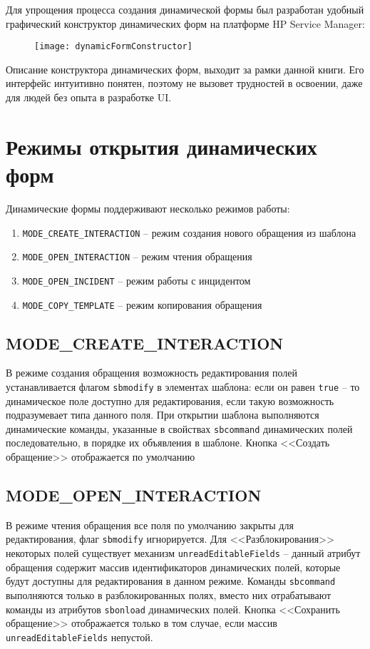 \documentclass[../index.tex]{subfiles}
\begin{document}
Для упрощения процесса создания динамической формы был разработан удобный графический конструктор
динамических форм на платформе HP Service Manager:

\begin{figure}[h]
    \texttt{[image: dynamicFormConstructor]}
    \centering
\end{figure}

Описание конструктора динамических форм, выходит за рамки данной книги.
Его интерфейс интуитивно понятен, поэтому не вызовет трудностей в освоении,
даже для людей без опыта в разработке UI.

\section{Режимы открытия динамических форм}
Динамические формы поддерживают несколько режимов работы:

\begin{enumerate}
    \item \verb|MODE_CREATE_INTERACTION| -- режим создания нового обращения из шаблона
    \item \verb|MODE_OPEN_INTERACTION| -- режим чтения обращения
    \item \verb|MODE_OPEN_INCIDENT| -- режим работы с инцидентом
    \item \verb|MODE_COPY_TEMPLATE| -- режим копирования обращения
\end{enumerate}

\subsection{MODE\_CREATE\_INTERACTION}
В режиме создания обращения возможность редактирования полей устанавливается 
флагом \verb|sbmodify| в элементах шаблона: если он равен \verb|true| -- то динамическое поле доступно для редактирования, если такую возможность подразумевает типа данного поля.
При открытии шаблона выполняются динамические команды, указанные в свойствах  \verb|sbcommand| динамических
полей последовательно, в порядке их объявления в шаблоне. Кнопка <<Создать обращение>> отображается по умолчанию
    
\subsection{MODE\_OPEN\_INTERACTION}
В режиме чтения обращения все поля по умолчанию закрыты для редактирования, флаг \verb|sbmodify| игнорируется.
Для <<Разблокирования>> некоторых полей существует механизм \verb|unreadEditableFields| -- данный атрибут обращения содержит массив идентификаторов динамических полей, которые будут доступны для редактирования в данном режиме. Команды \verb|sbcommand| выполняются только в разблокированных полях, вместо них отрабатывают команды из атрибутов \verb|sbonload| динамических полей. Кнопка <<Сохранить обращение>> отображается только в том случае, если массив \verb|unreadEditableFields| непустой.
\end{document}
